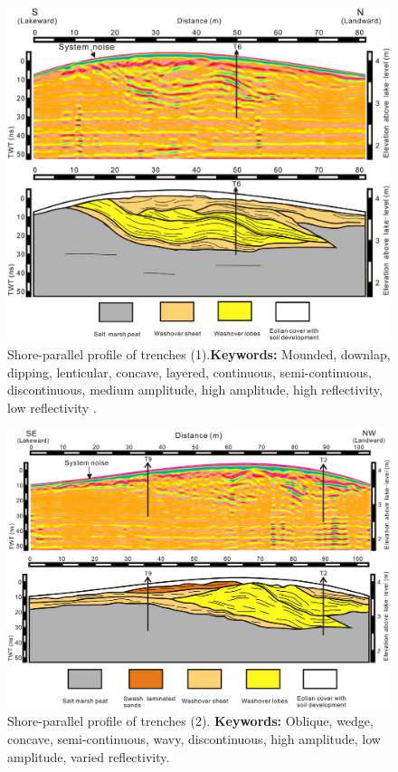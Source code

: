 \begin{figure}[h!]
    \centering
    \includegraphics[width=0.9\linewidth]{Figures/0.2GPR/Shan2015_fill_3.png}
    \caption[Shore-parallel profile of trenches (1).]{Shore-parallel profile of trenches (1).\textbf{Keywords: } Mounded, downlap, dipping, lenticular, concave, layered, continuous, semi-continuous, discontinuous, medium amplitude, high amplitude, high reflectivity, low reflectivity \citep{Shan2015}.}
    \label{fig:Shan2015-3}
\end{figure}
\begin{figure}[h!]
    \centering
    \includegraphics[width=0.9\linewidth]{Figures/0.2GPR/Shan2015_fill_4.png}
    \caption[Shore-parallel profile of trenches (2).]{Shore-parallel profile of trenches (2). \textbf{Keywords: } Oblique, wedge, concave, semi-continuous, wavy, discontinuous, high amplitude, low amplitude, varied reflectivity\citep{Shan2015}.}
    \label{fig:Shan2015-4}
\end{figure}

